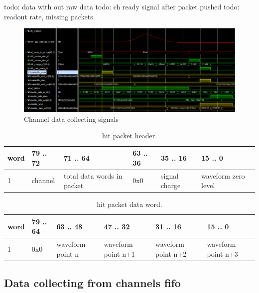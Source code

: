 \documentclass{article}
\begin{document}
todo: data with out raw data
todo: ch ready signal after packet pushed
todo: readout rate, missing packets

\begin{figure}[H]
	\centering 
	\includegraphics[width=1.0\textwidth]{ADC_ch_data_collector_wave.png}
	\caption{\label{fig:2} Channel data collecting signals}
\end{figure}





\begin{table}[H]
\centering
\begin{tabular}{| l | l | l | l | l | l |}
\hline
word & 79 .. 72 & 71 .. 64 & 63 .. 36 & 35 .. 16 & 15 .. 0 \\ \hline
1 & channel & total data words in packet& 0x0 & signal charge & waveform zero level \\ \hline
\end{tabular}
\caption{hit packet header.\label{tab1}}
\end{table}

\begin{table}[H]
\centering
\begin{tabular}{| l | l | l | l | l | l |}
\hline
word & 79 .. 64 & 63 .. 48 & 47 .. 32 & 31 .. 16 & 15 .. 0 \\ \hline
1 & 0x0 & waveform point n & waveform point n+1 & waveform point n+2 & waveform point n+3 \\ \hline
\end{tabular}
\caption{hit packet data word.\label{tab2}}
\end{table}








\subsection{Data collecting from channels fifo}
\end{document}
